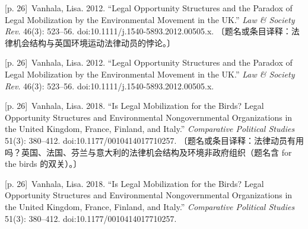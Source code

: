 \documentclass[10pt,a4paper]{article}
\begin{document}
\noindent\begin{minipage}{\textwidth}\begin{minipage}[t]{\dimexpr.5\textwidth-4mm\relax}{\scriptsize\color{gray} [p. 26]}\ Vanhala, Lisa. 2012. “Legal Opportunity Structures and the Paradox of Legal Mobilization by the Environmental Movement in the UK.” \textit{Law \& Society Rev}. 46(3): 523–56. doi:10.1111/j.1540-5893.2012.00505.x. 〔题名或条目译释：法律机会结构与英国环境运动法律动员的悖论。〕\par\end{minipage}\hfill\begin{minipage}[t]{\dimexpr.5\textwidth-4mm\relax}{\scriptsize\color{gray} [p. 26]}\ Vanhala, Lisa. 2012. “Legal Opportunity Structures and the Paradox of Legal Mobilization by the Environmental Movement in the UK.” \textit{Law \& Society Rev}. 46(3): 523–56. doi:10.1111/j.1540-5893.2012.00505.x.\par\end{minipage}\end{minipage}\par
\noindent\begin{minipage}{\textwidth}\begin{minipage}[t]{\dimexpr.5\textwidth-4mm\relax}{\scriptsize\color{gray} [p. 26]}\ Vanhala, Lisa. 2018. “Is Legal Mobilization for the Birds? Legal Opportunity Structures and Environmental Nongovernmental Organizations in the United Kingdom, France, Finland, and Italy.” \textit{Comparative Political Studies} 51(3): 380–412. doi:10.1177/0010414017710257. 〔题名或条目译释：法律动员有用吗？英国、法国、芬兰与意大利的法律机会结构及环境非政府组织（题名含 for the birds 的双关）。〕\par\end{minipage}\hfill\begin{minipage}[t]{\dimexpr.5\textwidth-4mm\relax}{\scriptsize\color{gray} [p. 26]}\ Vanhala, Lisa. 2018. “Is Legal Mobilization for the Birds? Legal Opportunity Structures and Environmental Nongovernmental Organizations in the United Kingdom, France, Finland, and Italy.” \textit{Comparative Political Studies} 51(3): 380–412. doi:10.1177/0010414017710257.\par\end{minipage}\end{minipage}\par
\end{document}
